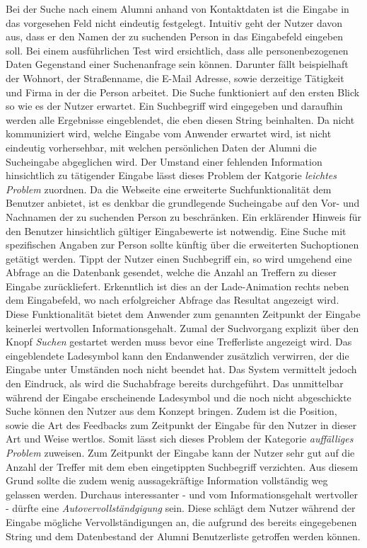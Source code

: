 {
	Bei der Suche nach einem Alumni anhand von Kontaktdaten ist die Eingabe in das vorgesehen Feld nicht eindeutig festgelegt. Intuitiv geht der Nutzer davon aus, dass er den Namen der zu suchenden Person in das Eingabefeld eingeben soll. Bei einem ausführlichen Test wird ersichtlich, dass alle personenbezogenen Daten Gegenstand einer Suchenanfrage sein können. Darunter fällt beispielhaft der Wohnort, der Straßenname, die E-Mail Adresse, sowie derzeitige Tätigkeit und Firma in der die Person arbeitet.
}
{
	Die Suche funktioniert auf den ersten Blick so wie es der Nutzer erwartet. Ein Suchbegriff wird eingegeben und daraufhin werden alle Ergebnisse eingeblendet, die eben diesen String  beinhalten. Da nicht kommuniziert wird, welche Eingabe vom Anwender erwartet wird, ist nicht eindeutig vorhersehbar, mit welchen persönlichen Daten der Alumni die Sucheingabe abgeglichen wird. Der Umstand einer fehlenden Information hinsichtlich zu tätigender Eingabe lässt dieses Problem der Katgorie \emph{leichtes Problem} zuordnen.
}
{
	Da die Webseite eine erweiterte Suchfunktionalität dem Benutzer anbietet, ist es denkbar die grundlegende Sucheingabe auf den Vor- und Nachnamen der zu suchenden Person zu beschränken. Ein erklärender Hinweis für den Benutzer hinsichtlich gültiger Eingabewerte ist notwendig. Eine Suche mit spezifischen Angaben zur Person sollte künftig über die erweiterten Suchoptionen getätigt werden.
}
{
	Tippt der Nutzer einen Suchbegriff ein, so wird umgehend eine Abfrage an die Datenbank gesendet, welche die Anzahl an Treffern zu dieser Eingabe zurückliefert. Erkenntlich ist dies an der Lade-Animation rechts neben dem Eingabefeld, wo nach erfolgreicher Abfrage das Resultat angezeigt wird. Diese Funktionalität bietet dem Anwender zum genannten Zeitpunkt der Eingabe keinerlei wertvollen Informationsgehalt. Zumal der Suchvorgang explizit über den Knopf \emph{Suchen} gestartet werden muss bevor eine Trefferliste angezeigt wird. Das eingeblendete Ladesymbol kann den Endanwender zusätzlich verwirren, der die Eingabe unter Umständen noch nicht beendet hat. Das System vermittelt jedoch den Eindruck, als wird die Suchabfrage bereits durchgeführt.
}
{
	Das unmittelbar während der Eingabe erscheinende Ladesymbol und die noch nicht abgeschickte Suche können den Nutzer aus dem Konzept bringen. Zudem ist die Position, sowie die Art des Feedbacks zum Zeitpunkt der Eingabe für den Nutzer in dieser Art und Weise wertlos. Somit lässt sich dieses Problem der Kategorie \emph{auffälliges Problem} zuweisen.
}
{
	Zum Zeitpunkt der Eingabe kann der Nutzer sehr gut auf die Anzahl der Treffer mit dem eben eingetippten Suchbegriff verzichten. Aus diesem Grund sollte die zudem wenig aussagekräftige Information vollständig weg gelassen werden. Durchaus interessanter - und vom Informationsgehalt wertvoller - dürfte eine \emph{Autovervollständgigung} sein. Diese schlägt dem Nutzer während der Eingabe mögliche Vervollständigungen an, die aufgrund des bereits eingegebenen String und dem Datenbestand der Alumni Benutzerliste getroffen werden können.
} 

